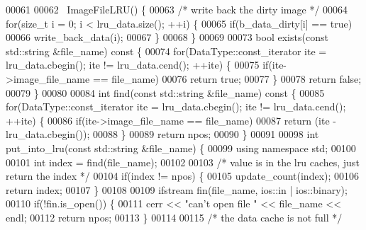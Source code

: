 \begin{DoxyCode}
00061 
00062         ~ImageFileLRU() \{
00063                 \textcolor{comment}{/* write back the dirty image */}
00064                 \textcolor{keywordflow}{for}(\textcolor{keywordtype}{size\_t} i = 0; i < lru\_data.size(); ++i) \{
00065                         \textcolor{keywordflow}{if}(b\_data\_dirty[i] == \textcolor{keyword}{true})
00066                                 write_back_data(i);
00067                 \}
00068         \}
00069 
00073         \textcolor{keywordtype}{bool} exists(\textcolor{keyword}{const} std::string &file\_name)\textcolor{keyword}{ const }\{
00074                 \textcolor{keywordflow}{for}(DataType::const\_iterator ite = lru\_data.cbegin(); ite != 
      lru\_data.cend(); ++ite) \{
00075                         \textcolor{keywordflow}{if}(ite->image\_file\_name == file\_name)
00076                                 \textcolor{keywordflow}{return} \textcolor{keyword}{true};
00077                 \}
00078                 \textcolor{keywordflow}{return} \textcolor{keyword}{false};
00079         \}
00080 
00084         \textcolor{keywordtype}{int} find(\textcolor{keyword}{const} std::string &file\_name)\textcolor{keyword}{ const }\{
00085                 \textcolor{keywordflow}{for}(DataType::const\_iterator ite = lru\_data.cbegin(); ite != 
      lru\_data.cend(); ++ite) \{
00086                         \textcolor{keywordflow}{if}(ite->image\_file\_name == file\_name)
00087                                 \textcolor{keywordflow}{return} (ite - lru\_data.cbegin());
00088                 \}
00089                 \textcolor{keywordflow}{return} npos;
00090         \}
00091 
00098         \textcolor{keywordtype}{int} put_into_lru(\textcolor{keyword}{const} std::string &file\_name) \{
00099                 \textcolor{keyword}{using namespace }std;
00100 
00101                 \textcolor{keywordtype}{int} index = find(file\_name);
00102 
00103                 \textcolor{comment}{/* value is in the lru caches, just return the index */}
00104                 \textcolor{keywordflow}{if}(index != npos)       \{
00105                         update_count(index);
00106                         \textcolor{keywordflow}{return} index;
00107                 \}
00108 
00109                 ifstream fin(file\_name, ios::in | ios::binary);
00110                 \textcolor{keywordflow}{if}(!fin.is\_open()) \{
00111                         cerr << \textcolor{stringliteral}{"can't open file "} << file\_name << endl;
00112                         \textcolor{keywordflow}{return} npos;
00113                 \}
00114 
00115                 \textcolor{comment}{/* the data cache is not full */}

\end{DoxyCode}
